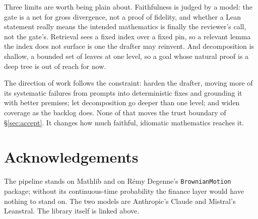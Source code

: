 \documentclass[11pt]{article}
\newcommand{\lean}[1]{\texttt{\def\_{\textunderscore\allowbreak}#1}}
\begin{document}
Three limits are worth being plain about. Faithfulness is judged by a model: the gate is a
net for gross divergence, not a proof of fidelity, and whether a Lean statement really
means the intended mathematics is finally the reviewer's call, not the gate's. Retrieval
sees a fixed index over a fixed pin, so a relevant lemma the index does not surface is one
the drafter may reinvent. And decomposition is shallow, a bounded set of leaves at one
level, so a goal whose natural proof is a deep tree is out of reach for now.

The direction of work follows the constraint: harden the drafter, moving more of its
systematic failures from prompts into deterministic fixes and grounding it with better
premises; let decomposition go deeper than one level; and widen coverage as the backlog
does. None of that moves the trust boundary of \S\ref{sec:accept}. It changes how much
faithful, idiomatic mathematics reaches it.

\section*{Acknowledgements}

The pipeline stands on Mathlib and on R\'emy Degenne's \lean{BrownianMotion} package;
without its continuous-time probability the finance layer would have nothing to stand on.
The two models are Anthropic's Claude and Mistral's Leanstral. The library itself is
linked above.
\end{document}
